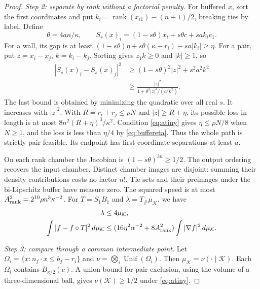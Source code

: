 \documentclass[11pt]{article}
\numberwithin{equation}{section}
\theoremstyle{definition}
\theoremstyle{remark}\newtheorem{remark}[theorem]{Remark}
\newcommand{\Unif}{\operatorname{Unif}}
\newcommand{\K}{\mathcal K}
\newcommand{\dd}{\,d}
\begin{document}
\begin{proof}
\emph{Step 2: separate by rank without a factorial penalty.}
For buffered $x$, sort the first coordinates and put
$k_i=\operatorname{rank}(x_{i1})-(n+1)/2$, breaking ties by label. Define
\begin{equation}\label{eq:rankmap}
 \theta=4an/\kappa,\qquad
 S_s(x)_i=(1-s\theta)x_i+s\theta c+sa k_i e_1.
\end{equation}
For a wall, its gap is at least
$(1-s\theta)\eta+s\theta(\kappa-r_i)-sa|k_i|\ge\eta$.
For a pair, put $z=x_i-x_j$, $k=k_i-k_j$. Sorting gives $z_1k\ge0$
and $|k|\ge1$, so
\begin{align}
 |S_s(x)_i-S_s(x)_j|^2
 &\ge(1-s\theta)^2|z|^2+s^2a^2k^2\nonumber\\
 &\ge\frac{|z|^2}{1+\theta^2|z|^2/(a^2k^2)}.\label{eq:rankpair}
\end{align}
The last bound is obtained by minimizing the quadratic over all real $s$.
It increases with $|z|^2$. With $R=r_i+r_j\le\rho N$ and
$|z|\ge R+\eta$, its possible loss in length is at most
$8n^2(R+\eta)^3/\kappa^2$. Condition \eqref{eq:atiny} gives
$\eta\le\rho N/8$ when $N\ge1$, and the loss is less than $\eta/4$
by \eqref{eq:buffereta}. Thus the whole path is strictly pair feasible.
Its endpoint has first-coordinate separations at least $a$.

On each rank chamber the Jacobian is $(1-s\theta)^{3n}\ge1/2$.
The output ordering recovers the input chamber. Distinct chamber images
are disjoint: summing their density contributions costs no factor $n!$.
Tie sets and their preimages under the bi-Lipschitz buffer have measure
zero. The squared speed is at most
$A_{\rm rank}^2=2^{10}\rho n^3\kappa^{-2}$.
For $T=S_1B_1$ and $\lambda=T_\#\mu_\K$, we have
\begin{align}
 \lambda&\le4\mu_\K,\label{eq:lambdadensity}\\
 \int|f-f\circ T|^2\dd\mu_\K
 &\le(16\eta^2\alpha^{-2}+8A_{\rm rank}^2)
                      \int|\nabla f|^2\dd\mu_\K.\label{eq:rankenergy}
\end{align}

\emph{Step 3: compare through a common intermediate point.}
Let $\Omega_i=\{x:n_f\cdot x\le b_f-r_i\}$ and
$\nu=\bigotimes_i\Unif(\Omega_i)$. Then $\mu_\K=\nu(\cdot\mid\K)$.
Each $\Omega_i$ contains $B_{\kappa/2}(c)$. A union bound for pair
exclusion, using the volume of a three-dimensional ball, gives
$\nu(\K)\ge1/2$ under \eqref{eq:atiny}.


\end{proof}
\end{document}
